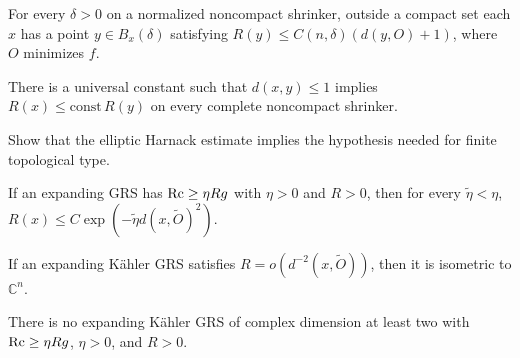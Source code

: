 \begin{lemma}
\label{lem:chow-iv-linear-net-scalar}
For every $\delta>0$ on a normalized noncompact shrinker, outside a compact set
each $x$ has a point $y\in B_x(\delta)$ satisfying
$R(y)\le C(n,\delta)(d(y,O)+1)$, where $O$ minimizes $f$.
\end{lemma}

\begin{conjecture}
\label{conj:chow-iv-elliptic-harnack}
There is a universal constant such that $d(x,y)\le1$ implies
$R(x)\le\mathrm{const}\,R(y)$ on every complete noncompact shrinker.
\end{conjecture}

\begin{claim}
\label{ex:chow-iv-harnack-topology}
Show that the elliptic Harnack estimate implies the hypothesis needed for finite
topological type.
\end{claim}

\begin{proposition}
\label{prop:chow-iv-expander-curvature-decay}
If an expanding GRS has $\operatorname{Rc}\ge\eta Rg$ with $\eta>0$ and $R>0$, then for
every $\widetilde\eta<\eta$,
$R(x)\le C\exp(-\widetilde\eta d(x,\widetilde O)^2)$.
\end{proposition}

\begin{theorem}
\label{thm:chow-iv-kahler-expander-rigidity}
If an expanding K\"ahler GRS satisfies $R=o(d^{-2}(x,\widetilde O))$, then it is
isometric to $\mathbb C^n$.
\end{theorem}

\begin{corollary}
\label{cor:chow-iv-kahler-expander-nonexistence}
There is no expanding K\"ahler GRS of complex dimension at least two with
$\operatorname{Rc}\ge\eta Rg$, $\eta>0$, and $R>0$.
\end{corollary}

